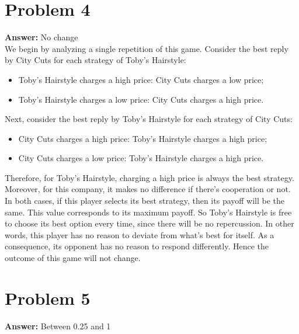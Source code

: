 \documentclass[11pt]{article}
\begin{document}
\section*{Problem 4}
\label{sec:orge254c9c}

\textbf{Answer:} No change\\

We begin by analyzing a single repetition of this game. Consider the best reply
by City Cuts for each strategy of Toby's Hairstyle:
\begin{itemize}
\item Toby's Hairstyle charges a high price: City Cuts charges a low price;
\item Toby's Hairstyle charges a low price: City Cuts charges a high price.
\end{itemize}
Next, consider the best reply by Toby's Hairstyle for each strategy of City
Cuts:
\begin{itemize}
\item City Cuts charges a high price: Toby's Hairstyle charges a high price;
\item City Cuts charges a low price: Toby's Hairstyle charges a high price.
\end{itemize}
Therefore, for Toby's Hairstyle, charging a high price is always the best
strategy. Moreover, for this company, it makes no difference if there's
cooperation or not. In both cases, if this player selects its best strategy,
then its payoff will be the same. This value corresponds to its maximum payoff.
So Toby's Hairstyle is free to choose its best option every time, since there
will be no repercussion. In other words, this player has no reason to deviate
from what's best for itself. As a consequence, its opponent has no reason to
respond differently. Hence the outcome of this game will not change.
\section*{Problem 5}
\label{sec:org302a47e}

\textbf{Answer:} Between 0.25 and 1\\
\end{document}
